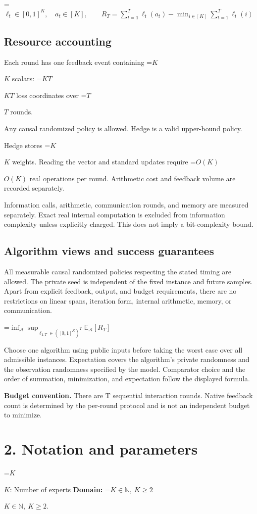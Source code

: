 \documentclass[10pt,a4paper]{article}
\newcommand{\AtlasMath}[1]{\par\begingroup\centering\setbox0=\hbox{$\displaystyle #1$}\ifdim\wd0>1.4\linewidth\typeout{ATLAS WIDE FORMULA: \the\wd0}\fi\ifdim\wd0>\linewidth\resizebox{\linewidth}{!}{\box0}\else\box0\fi\par\endgroup}
\newcommand{\AtlasInlineMath}[1]{\begingroup\setbox0=\hbox{$#1$}\ifdim\wd0>.4\linewidth\endgroup\AtlasMath{#1}\else\endgroup$#1$\fi}
\begin{document}
\AtlasMath{\ell_t\in[0,1]^K,\quad a_t\in[K],\qquad R_T=\sum_{t=1}^T\ell_t(a_t)-\min_{i\in[K]}\sum_{t=1}^T\ell_t(i)}


\subsection{Resource accounting}
Each round has one feedback event containing \AtlasInlineMath{K} scalars: \AtlasInlineMath{KT} loss coordinates over \AtlasInlineMath{T} rounds.

Any causal randomized policy is allowed. Hedge is a valid upper-bound policy.

Hedge stores \AtlasInlineMath{K} weights. Reading the vector and standard updates require \AtlasInlineMath{O(K)} real operations per round. Arithmetic cost and feedback volume are recorded separately.

Information calls, arithmetic, communication rounds, and memory are measured separately. Exact real internal computation is excluded from information complexity unless explicitly charged. This does not imply a bit-complexity bound.

\subsection{Algorithm views and success guarantees}
All measurable causal randomized policies respecting the stated timing are allowed. The private seed is independent of the fixed instance and future samples. Apart from explicit feedback, output, and budget requirements, there are no restrictions on linear spans, iteration form, internal arithmetic, memory, or communication.


\AtlasMath{\inf_{\mathcal{A}}\sup_{\ell_{1:T}\in([0,1]^K)^T}\mathbb{E}_{\mathcal{A}}[R_T]}


Choose one algorithm using public inputs before taking the worst case over all admissible instances. Expectation covers the algorithm's private randomness and the observation randomness specified by the model. Comparator choice and the order of summation, minimization, and expectation follow the displayed formula.

\textbf{Budget convention.} There are T sequential interaction rounds. Native feedback count is determined by the per-round protocol and is not an independent budget to minimize.

\section{2. Notation and parameters}
\AtlasInlineMath{K}: Number of experts \textbf{Domain:} \AtlasInlineMath{K\in\mathbb N,\ K\ge2}.
\end{document}
